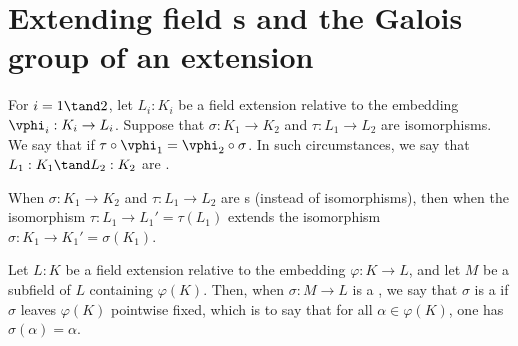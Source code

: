\documentclass{article}
\begin{document}

\setcounter{definition}{15}
\setcounter{section}{2}
\section{Extending field \homo s and the Galois group of an extension}
  \begin{definition}
    For $i = 1 \tand 2$, let $L_i : K_i$ be a field extension relative to the embedding $\vphi_i : K_i\to L_i$.
    Suppose that $ \sigma : K_1\to K_2 $ and $ \tau:L_1\to L_2 $ are isomorphisms.
    We say that  if $ \tau\circ\vphi_1 = \vphi_2\circ\sigma $.
    In such circumstances, we say that $L_1 : K_1 \tand L_2 : K_2$ are .

    When $ \sigma:K_1\to K_2 $ and $ \tau:L_1\to L_2 $ are \homo s (instead of isomorphisms), then   when the isomorphism $ \tau:L_1\to L_1' = \tau(L_1) $ extends the isomorphism $ \sigma:K_1\to K_1' = \sigma(K_1) $.
  \end{definition}

  \begin{definition}[$F$-\homo]
    Let \(L : K\) be a field extension relative to the embedding \(\varphi : K \to L\), and let \(M\) be a subfield of \(L\) containing \(\varphi(K)\).
    Then, when \(\sigma : M \to L\) is a \homo , we say that \(\sigma\) is a  if \(\sigma\) leaves \(\varphi(K)\) pointwise fixed, which is to say that for all \(\alpha \in \varphi(K)\), one has $\sigma(\alpha) = \alpha$.
  \end{definition}
\end{document}
